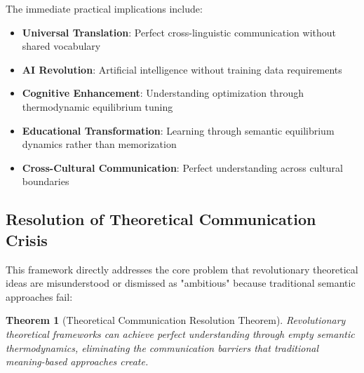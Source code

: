 \documentclass[11pt,a4paper]{article}
\newtheorem{theorem}{Theorem}[section]
\begin{document}
The immediate practical implications include:

\begin{itemize}
\item \textbf{Universal Translation}: Perfect cross-linguistic communication without shared vocabulary
\item \textbf{AI Revolution}: Artificial intelligence without training data requirements
\item \textbf{Cognitive Enhancement}: Understanding optimization through thermodynamic equilibrium tuning
\item \textbf{Educational Transformation}: Learning through semantic equilibrium dynamics rather than memorization
\item \textbf{Cross-Cultural Communication}: Perfect understanding across cultural boundaries
\end{itemize}

\subsection{Resolution of Theoretical Communication Crisis}

This framework directly addresses the core problem that revolutionary theoretical ideas are misunderstood or dismissed as "ambitious" because traditional semantic approaches fail:

\begin{theorem}[Theoretical Communication Resolution Theorem]
Revolutionary theoretical frameworks can achieve perfect understanding through empty semantic thermodynamics, eliminating the communication barriers that traditional meaning-based approaches create.
\end{theorem}
\end{document}
